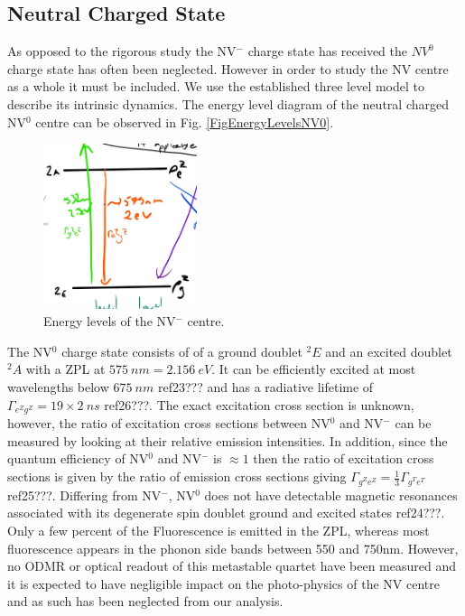 \documentclass[,prl,twocolumn]{revtex4}
\begin{document}
\subsection{Neutral Charged State}
As opposed to the rigorous study the NV$^-$ charge state has received the $NV^0$ charge state has often been neglected. However in order to study the NV centre as a whole it must be included. We use the established three level model to describe its intrinsic dynamics. The energy level diagram of the neutral charged NV$^0$ centre  can be observed in Fig. \ref{FigEnergyLevelsNV0}.

\begin{figure}[H]
  \centering
  \includegraphics[width=0.4\textwidth]{NV0.jpg} 
 \caption{Energy levels of the NV$^-$ centre.} \label{FigEnergyLevelsNV-}
\end{figure}

The NV$^0$ charge state consists of of a ground doublet $^2E$ and an excited doublet $^2A$ with a ZPL at $\SI{575}{nm} = \SI{2.156}{eV}$.  It can be efficiently excited at most wavelengths below $\SI{675}{nm}$ ref23??? and has a radiative lifetime of $\Gamma_{e^Zg^Z} = 19\times2 \SI{}{ns}$ ref26???. The exact excitation cross section is unknown, however, the ratio of excitation cross sections between NV$^0$ and NV$^-$ can be measured by looking at their relative emission intensities. In addition, since the quantum efficiency of NV$^0$ and NV$^-$ is $\approx 1$ then the ratio of excitation cross sections is given by the ratio of emission cross sections giving $\Gamma_{g^Ze^Z} = \frac{1}{3} \Gamma_{g^Te^T}$ ref25???. Differing from NV$^-$, NV$^0$ does not have detectable magnetic resonances associated with its degenerate spin doublet ground and excited states ref24???. Only a few percent of the Fluorescence is emitted in the ZPL, whereas most fluorescence appears in the phonon side bands between 550 and 750nm. However, no ODMR or optical readout of this metastable quartet have been measured and it is expected to have negligible impact on the photo-physics of the NV centre and as such has been neglected from our analysis. 
  
\end{document}
